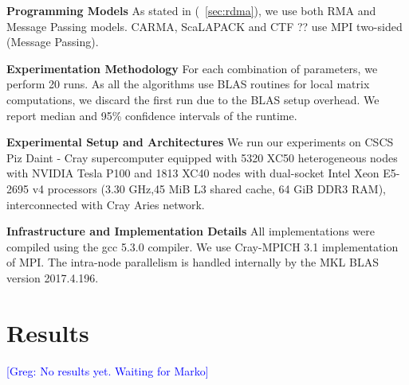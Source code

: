 \documentclass[sigplan,review,anonymous]{acmart}\settopmatter{printfolios=true,printccs=false,printacmref=false}
\newcommand\greg[1]{\textcolor{blue}{[Greg: #1]}}
\newcommand\mac[1]{\textcolor{red}{[Mac: #1]}}
\newcommand{\macb}[1]{\textbf{\textsf{#1}}}
\begin{document}
\macb{Programming Models}
%
As stated in (~\cref{sec:rdma}), we use both RMA and Message Passing models. 
CARMA, ScaLAPACK and CTF ?? use MPI two-sided (Message Passing).

\macb{Experimentation Methodology}
%
For each combination of parameters, we perform 20 runs. As all the algorithms 
use BLAS routines for local matrix computations, we discard the first run due 
to the BLAS setup overhead. We report median and 95\% confidence intervals of 
the runtime.

\macb{Experimental Setup and Architectures}
%
We run our experiments on CSCS Piz Daint - Cray supercomputer equipped with
5320 XC50 heterogeneous nodes with NVIDIA Tesla P100 and 1813 XC40 nodes with
dual-socket Intel Xeon E5-2695 v4 processors (3.30 GHz,45 MiB L3 shared cache, 
64 GiB DDR3 RAM),
interconnected with Cray Aries network.

\macb{Infrastructure and Implementation Details}
%
All implementations were compiled using the gcc 5.3.0 compiler. We use 
Cray-MPICH 3.1 implementation of MPI. The intra-node parallelism is handled 
internally by the MKL BLAS version 2017.4.196. 

\section{Results}
\label{sec:results}
\greg{No results yet. Waiting for Marko}



\end{document}
